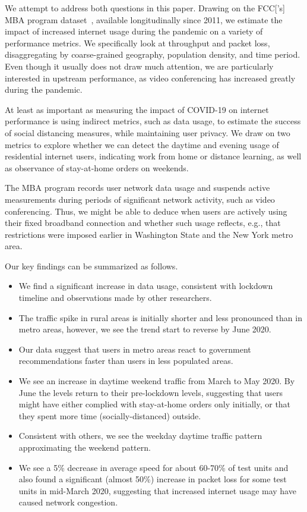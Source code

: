 \documentclass[conference,10pt]{IEEEtran}
\begin{document}
We attempt to address both questions in this paper. Drawing on the \gls{FCC}['s] \gls{MBA} program dataset~\cite{mba}, available longitudinally since 2011, we estimate the impact of increased internet usage during the pandemic on a variety of performance metrics. We specifically look at throughput and packet loss, disaggregating by coarse-grained geography, population density, and time period. Even though it usually does not draw much attention, we are particularly interested in upstream performance, as video conferencing has increased greatly during the pandemic.

At least as important as measuring the impact of COVID-19 on internet performance is using indirect metrics, such as data usage, to estimate the success of social distancing measures, while maintaining user privacy. We draw on two metrics to explore whether we can detect the daytime and evening usage of residential internet users, indicating work from home or distance learning, as well as observance of stay-at-home orders on weekends.

The \gls{MBA} program records user network data usage and suspends active measurements during periods of significant network activity, such as video conferencing. Thus, we might be able to deduce when users are actively using their fixed broadband connection and whether such usage reflects, e.g., that restrictions were imposed earlier in Washington State and the New York metro area.

Our key findings can be summarized as follows.
\begin{itemize}[leftmargin=0.15in]
    \item We find a significant increase in data usage, consistent with lockdown timeline and observations made by other researchers.
    \item The traffic spike in rural areas is initially shorter and less pronounced than in metro areas, however, we see the trend start to reverse by June 2020.
    \item Our data suggest that users in metro areas react to government recommendations faster than users in less populated areas.
    \item We see an increase in daytime weekend traffic from March to May 2020. By June the levels return to their pre-lockdown levels, suggesting that users might have either complied with stay-at-home orders only initially, or that they spent more time (socially-distanced) outside.
    \item Consistent with others, we see the weekday daytime traffic pattern approximating the weekend pattern.
    \item We see a 5\% decrease in average speed for about 60-70\% of test units and also found a significant (almost 50\%) increase in packet loss for some test units in mid-March 2020, suggesting that increased internet usage may have caused network congestion.
\end{itemize}
\end{document}
